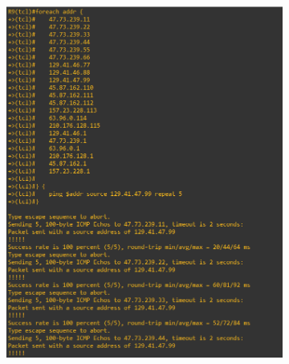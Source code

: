\documentclass[11pt,english, openright, oneside]{book}
\begin{document}
\pagebreak
\begin{figure}[H]
  \centering
  \begin{subfigure}{.5\textwidth}
      \centering
      \includegraphics[width=0.94\linewidth]{imagens/Tarefa2/7.tcl_R9_1.png}
  \end{subfigure}%
  \begin{subfigure}{.5\textwidth}
      \centering

\end{subfigure}
\end{figure}
\end{document}
